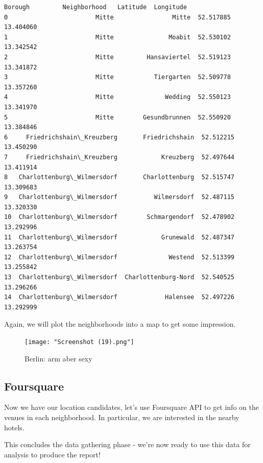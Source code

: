 \documentclass[11pt]{article}
\makeatletter
\newcommand{\boxspacing}{\kern\kvtcb@left@rule\kern\kvtcb@boxsep}
\newcommand{\prompt}[4]{
        {\ttfamily\llap{{\color{#2}[#3]:\hspace{3pt}#4}}\vspace{-\baselineskip}}
    }
\makeatother
\begin{document}
                \begin{tcolorbox}[breakable, size=fbox, boxrule=.5pt, pad at break*=1mm, opacityfill=0]
\begin{Verbatim}[commandchars=\\\{\}]
                       Borough         Neighborhood   Latitude  Longitude
0                        Mitte                Mitte  52.517885  13.404060
1                        Mitte               Moabit  52.530102  13.342542
2                        Mitte         Hansaviertel  52.519123  13.341872
3                        Mitte           Tiergarten  52.509778  13.357260
4                        Mitte              Wedding  52.550123  13.341970
5                        Mitte        Gesundbrunnen  52.550920  13.384846
6     Friedrichshain\_Kreuzberg       Friedrichshain  52.512215  13.450290
7     Friedrichshain\_Kreuzberg            Kreuzberg  52.497644  13.411914
8   Charlottenburg\_Wilmersdorf       Charlottenburg  52.515747  13.309683
9   Charlottenburg\_Wilmersdorf          Wilmersdorf  52.487115  13.320330
10  Charlottenburg\_Wilmersdorf        Schmargendorf  52.478902  13.292996
11  Charlottenburg\_Wilmersdorf            Grunewald  52.487347  13.263754
12  Charlottenburg\_Wilmersdorf              Westend  52.513399  13.255842
13  Charlottenburg\_Wilmersdorf  Charlottenburg-Nord  52.540525  13.296266
14  Charlottenburg\_Wilmersdorf             Halensee  52.497226  13.292999
\end{Verbatim}
\end{tcolorbox}
        
    Again, we will plot the neighborhoods into a map to get some impression.

    \begin{figure}
\centering
\texttt{[image: "Screenshot (19).png"]}
\caption{Berlin: arm aber sexy}
\end{figure}


        
    \hypertarget{foursquare}{%
\subsection{Foursquare}\label{foursquare}}

Now we have our location candidates, let's use Foursquare API to
get info on the venues in each neighborhood. In particular, we are
interested in the nearby hotels.


        
    This concludes the data gathering phase - we're now ready to use this
data for analysis to produce the report!
\end{document}
